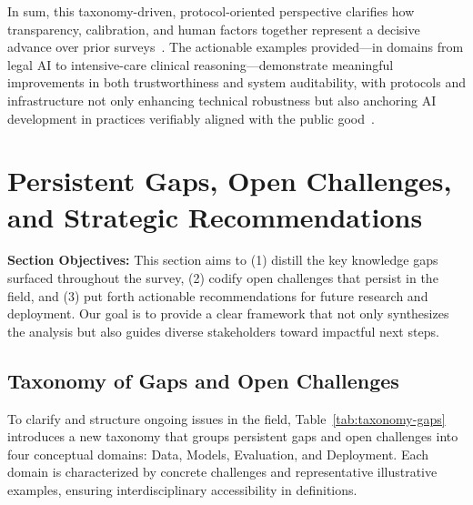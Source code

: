 \documentclass[sigconf]{acmart}
\begin{document}
In sum, this taxonomy-driven, protocol-oriented perspective clarifies how transparency, calibration, and human factors together represent a decisive advance over prior surveys~\cite{ref52,ref55}. The actionable examples provided—in domains from legal AI to intensive-care clinical reasoning—demonstrate meaningful improvements in both trustworthiness and system auditability, with protocols and infrastructure not only enhancing technical robustness but also anchoring AI development in practices verifiably aligned with the public good~\cite{ref23,ref53,ref54,ref55}.

\section{Persistent Gaps, Open Challenges, and Strategic Recommendations}

\vspace{0.5em}
\textbf{Section Objectives:} This section aims to (1) distill the key knowledge gaps surfaced throughout the survey, (2) codify open challenges that persist in the field, and (3) put forth actionable recommendations for future research and deployment. Our goal is to provide a clear framework that not only synthesizes the analysis but also guides diverse stakeholders toward impactful next steps.
\vspace{0.5em}

\subsection{Taxonomy of Gaps and Open Challenges}

To clarify and structure ongoing issues in the field, Table~\ref{tab:taxonomy-gaps} introduces a new taxonomy that groups persistent gaps and open challenges into four conceptual domains: Data, Models, Evaluation, and Deployment. Each domain is characterized by concrete challenges and representative illustrative examples, ensuring interdisciplinary accessibility in definitions.
\end{document}
